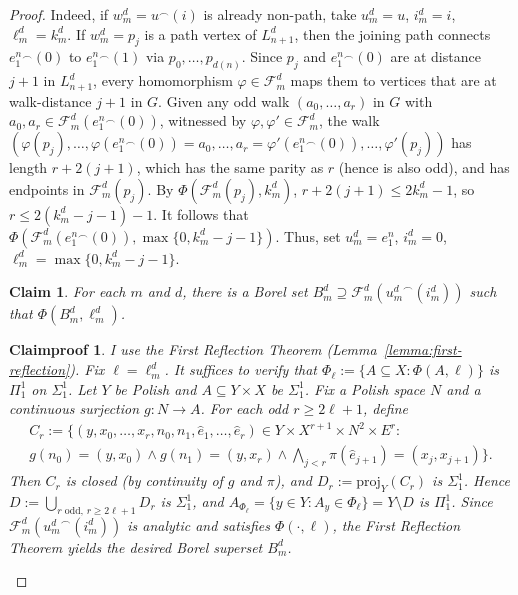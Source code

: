 \documentclass[10pt,a4paper]{amsart}
\newtheorem{claim}{Claim}
\newtheorem{claimproof}{Claimproof}
\begin{document}
\begin{proof}
    Indeed, if $w^d_m=u^\smallfrown(i)$ is already non-path, take $u^d_m=u$, $i^d_m=i$, $\ell^d_m=k^d_m$.
    If $w^d_m=p_j$ is a path vertex of $L^d_{n+1}$, then the joining path connects $e_1^n{}^\smallfrown(0)$ to $e_1^n{}^\smallfrown(1)$ via $p_0,\dots,p_{d(n)}$.
    Since $p_j$ and $e_1^n{}^\smallfrown(0)$ are at distance $j+1$ in $L^d_{n+1}$, every homomorphism $\varphi\in\mathcal F^d_m$ maps them to vertices that are at walk-distance $j+1$ in $G$.
    Given any odd walk $(a_0,\dots,a_r)$ in $G$ with $a_0,a_r\in\mathcal F^d_m(e_1^n{}^\smallfrown(0))$, witnessed by $\varphi,\varphi'\in\mathcal F^d_m$, the walk $(\varphi(p_j),\dots,\varphi(e_1^n{}^\smallfrown(0))=a_0,\dots,a_r=\varphi'(e_1^n{}^\smallfrown(0)),\dots,\varphi'(p_j))$ has length $r+2(j+1)$, which has the same parity as $r$ (hence is also odd), and has endpoints in $\mathcal F^d_m(p_j)$.
    By $\Phi(\mathcal F^d_m(p_j),k^d_m)$, $r+2(j+1)\leq 2k^d_m-1$, so $r\leq 2(k^d_m-j-1)-1$.
    It follows that $\Phi(\mathcal F^d_m(e_1^n{}^\smallfrown(0)),\max\{0,k^d_m-j-1\})$.
    Thus, set $u^d_m=e_1^n$, $i^d_m=0$, $\ell^d_m=\max\{0,k^d_m-j-1\}$.
    
    \begin{claim}
        For each $m$ and $d$, there is a Borel set $B^d_m\supseteq\mathcal F^d_m({u^d_m}^\smallfrown(i^d_m))$ such that $\Phi(B^d_m,\ell^d_m)$.
    \end{claim}

    \begin{claimproof}
        I use the First Reflection Theorem (Lemma~\ref{lemma:first-reflection}).
        Fix $\ell=\ell^d_m$.
        It suffices to verify that $\Phi_\ell:=\{A\subseteq X:\Phi(A,\ell)\}$ is $\Pi^1_1$ on $\Sigma^1_1$.
        Let $Y$ be Polish and $A\subseteq Y\times X$ be $\Sigma^1_1$.
        Fix a Polish space $N$ and a continuous surjection $g\colon N\to A$.
        For each odd $r\geq 2\ell+1$, define
        \begin{align*}
            C_r:=\{(y,x_0,\dots,x_r,n_0,n_1,\hat e_1,\dots,\hat e_r)\in Y\times X^{r+1}\times N^2\times E^r:{}\\
            g(n_0)=(y,x_0)\land g(n_1)=(y,x_r)\land\textstyle\bigwedge_{j<r}\pi(\hat e_{j+1})=(x_j,x_{j+1})\}.
        \end{align*}
        Then $C_r$ is closed (by continuity of $g$ and $\pi$), and $D_r:=\mathrm{proj}_Y(C_r)$ is $\Sigma^1_1$.
        Hence $D:=\bigcup_{r\text{ odd},\,r\geq 2\ell+1}D_r$ is $\Sigma^1_1$, and
        $A_{\Phi_\ell}=\{y\in Y:A_y\in\Phi_\ell\}=Y\setminus D$
        is $\Pi^1_1$.
        Since $\mathcal F^d_m({u^d_m}^\smallfrown(i^d_m))$ is analytic and satisfies $\Phi(\cdot,\ell)$, the First Reflection Theorem yields the desired Borel superset $B^d_m$.
    \end{claimproof}


\end{proof}
\end{document}
